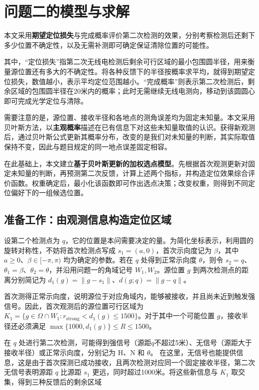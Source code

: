\documentclass[UTF8,a4paper,zihao=-4,fontset=none]{ctexart}
\begin{document}
\section{问题二的模型与求解}

本文采用\textbf{期望定位损失}与{完成概率}评价第二次检测的效果，分别考察检测后还剩下多少位置不确定性，以及无需补测即可确定保证清除位置的可能性。

其中，“定位损失”指第二次无线电检测后剩余可行区域的最小包围圆半径，用来衡量源位置还有多大的不确定性。将各种反馈下的半径按概率求平均，就得到期望定位损失，数值越小，表示平均定位范围越小。“完成概率”则表示第二次检测后，剩余区域的包围圆半径在20米内的概率；此时无需继续无线电测向，移动到该圆圆心即可完成光学定位与清除。

需要注意的是，源位置、接收半径和各地点的测角误差均为固定未知量。本文采用贝叶斯方法，以\textbf{主观概率}描述在已有信息下对这些未知量取值的认识。获得新观测后，通过贝叶斯公式更新其概率分布，改变的是我们对未知量的判断，其实际取值保持不变，因此与题目规定的同一地点误差固定相容。

在此基础上，本文建立\textbf{基于贝叶斯更新的加权选点模型}。先根据首次观测更新对固定未知量的判断，再预测第二次反馈，计算上述两个指标，并构造定位效果综合评价函数。权重确定后，最小化该函数即可作出选点决策；改变权重，则得到不同定位偏好下的一组候选位置。

\subsection{准备工作：由观测信息构造定位区域}

设第二个检测点为 \(q\)，它的位置是本问需要决定的量。为简化坐标表示，利用圆的旋转对称性，不妨将首次检测点写成 \(s_1=(a,0)\)，首次示向度记为 \(\beta\)，其中 \(a\ge0\)、\(\beta\in[-\pi,\pi)\) 均为确定的参数。若在 \(q\) 处得到正常示向度 \(\theta\)，则令 \(s_2=q\)、\(\theta_1=\beta\)、\(\theta_2=\theta\)，并沿用问题一的角域记号 \(W_1,W_2\)。源位置 \(g\) 到两次检测点的距离分别简记为 \(d_1(g)=\|g-s_1\|\)、\(d(g;q)=\|g-q\|\)。

首次测得正常示向度，说明源位于对应角域内，能够被接收，并且尚未近到触发强信号。因此，首次观测后的源位置可行区域为 \(K_1=\{g\in\Omega\cap W_1:r_{\mathrm{strong}}<d_1(g)\le1500\}\)。对于其中一个可能位置 \(g\)，接收半径还必须满足 \(\max\{1000,d_1(g)\}\le R\le1500\)。

在 \(q\) 处进行第二次检测，可能得到强信号（源距\(q\)不超过5米）、无信号（源距大于接收半径）或正常示向度，分别记为 \(\mathrm H\)、\(\mathrm N\) 和 \(\theta\)。
在这里，无信号也能提供信息，这是由于首次探测已成功接收，且两次检测对应同一个固定接收半径，第二次无信号表明源距 \(q\) 比源距 \(s_1\) 更远，同时超过1000米。将这些新信息与 \(K_1\) 取交集，得到三种反馈后的剩余区域
\end{document}
